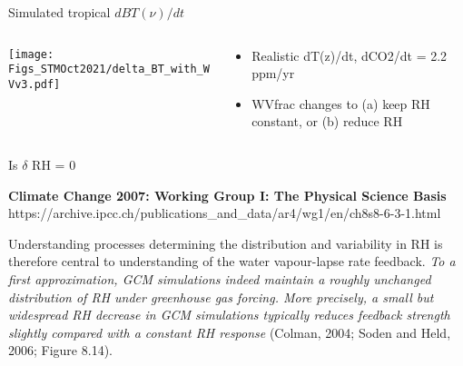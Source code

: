 \documentclass[10pt,t]{beamer}
\begin{document}
\begin{frame}{Simulated tropical $dBT(\nu)/dt$}

\vspace{-0.1in}
\begin{columns}

\begin{column}{0.75\columnwidth}
\begin{block}{}
\vspace{-0.1in}
\begin{center}
\texttt{[image: Figs\_STMOct2021/delta\_BT\_with\_WVv3.pdf]}
\end{center}
\end{block}
\end{column}

\begin{column}{0.35\columnwidth}
\begin{block}{}

\begin{itemize}
\item Realistic dT(z)/dt, dCO2/dt = 2.2 ppm/yr
\item WVfrac changes to (a) keep RH constant, or \newline (b) reduce RH
\end{itemize}
\end{block}
\end{column}

\end{columns}

\end{frame}


\begin{frame}{Is $\delta$ RH = 0}


{\bf Climate Change 2007: Working Group I: The Physical Science Basis} \newline
https://archive.ipcc.ch/publications\_and\_data/ar4/wg1/en/ch8s8-6-3-1.html \newline

Understanding processes determining the distribution and variability
in RH is therefore central to understanding of the water vapour-lapse
rate feedback. \emph{To a first approximation, GCM simulations indeed
maintain a roughly unchanged distribution of RH under greenhouse gas
forcing. More precisely, a small but widespread RH decrease in GCM
simulations typically reduces feedback strength slightly compared with
a constant RH response} (Colman, 2004; Soden and Held, 2006; Figure
8.14).

\end{frame}
\end{document}
